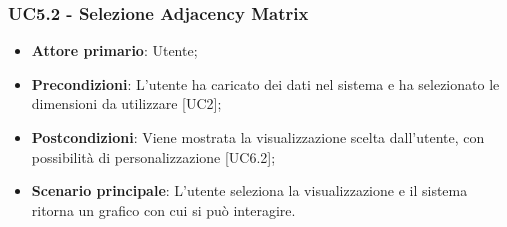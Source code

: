 \subsubsection{UC5.2 - Selezione Adjacency Matrix}
\begin{itemize}
	\item \textbf{Attore primario}: Utente;
	\item \textbf{Precondizioni}: L'utente ha caricato dei dati nel sistema e ha selezionato le dimensioni da utilizzare [UC2];
	\item \textbf{Postcondizioni}: Viene mostrata la visualizzazione  scelta dall'utente, con possibilità di personalizzazione [UC6.2];
	\item \textbf{Scenario principale}: L'utente seleziona la visualizzazione  e il sistema ritorna un grafico con cui si può interagire.

\end{itemize}